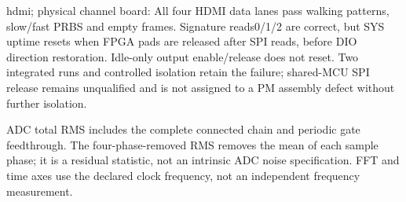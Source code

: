 hdmi; physic\allowbreak{}al channe\allowbreak{}l board: All four HDMI data lanes pass walkin\allowbreak{}g patter\allowbreak{}ns,\allowbreak{} slow/\allowbreak{}fast PRBS and empty frames\allowbreak{}. Signat\allowbreak{}ure reads0\allowbreak{}/\allowbreak{}1/\allowbreak{}2 are correc\allowbreak{}t,\allowbreak{} but SYS uptime\allowbreak{} resets\allowbreak{} when FPGA pads are releas\allowbreak{}ed after SPI reads,\allowbreak{} before\allowbreak{} DIO direct\allowbreak{}ion restor\allowbreak{}ation. Idle-\allowbreak{}only output\allowbreak{} enable\allowbreak{}/\allowbreak{}releas\allowbreak{}e does not reset. Two integr\allowbreak{}ated runs and contro\allowbreak{}lled isolat\allowbreak{}ion retain\allowbreak{} the failur\allowbreak{}e; shared\allowbreak{}-\allowbreak{}MCU SPI releas\allowbreak{}e remain\allowbreak{}s unqual\allowbreak{}ified and is not assign\allowbreak{}ed to a PM assemb\allowbreak{}ly defect\allowbreak{} withou\allowbreak{}t furthe\allowbreak{}r isolat\allowbreak{}ion.

ADC total RMS includes the complete connected chain and periodic gate feedthrough. The four-phase-removed RMS removes the mean of each sample phase; it is a residual statistic, not an intrinsic ADC noise specification. FFT and time axes use the declared clock frequency, not an independent frequency measurement.

